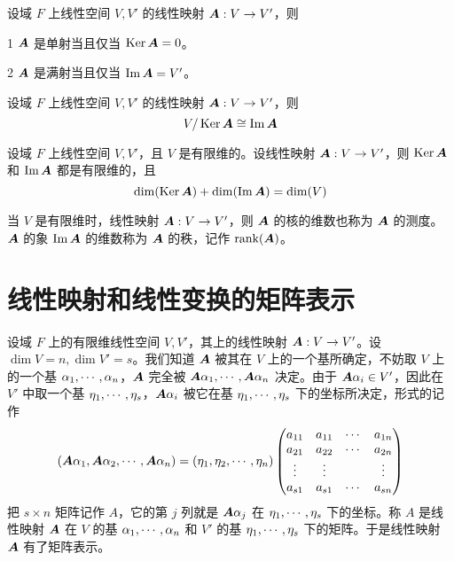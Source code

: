 \begin{proposition}
    设域 $F$ 上线性空间 $V,V'$ 的线性映射 $\boldsymbol{A} : V \to V'$，则
    
    \num{1} $\boldsymbol{A}$ 是单射当且仅当 $\operatorname{Ker} \boldsymbol{A} = 0$。

    \num{2} $\boldsymbol{A}$ 是满射当且仅当 $\operatorname{Im} \boldsymbol{A} = V'$。
\end{proposition}

\begin{theorem}
    设域 $F$ 上线性空间 $V,V'$ 的线性映射 $\boldsymbol{A} : V \to V'$，则
    \[ V / \operatorname{Ker} \boldsymbol{A} \cong \operatorname{Im} \boldsymbol{A} \]
\end{theorem}

\begin{theorem}
    设域 $F$ 上线性空间 $V,V'$，且 $V$ 是有限维的。设线性映射 $\boldsymbol{A} : V \to V'$，则 $\operatorname{Ker} \boldsymbol{A}$ 和 $\operatorname{Im} \boldsymbol{A}$ 都是有限维的，且
    \[ \dim(\operatorname{Ker} \boldsymbol{A}) + \dim(\operatorname{Im} \boldsymbol{A}) = \dim(V) \]
\end{theorem}

当 $V$ 是有限维时，线性映射 $\boldsymbol{A} : V \to V'$，则 $\boldsymbol{A}$ 的核的维数也称为 $\boldsymbol{A}$ 的测度。$\boldsymbol{A}$ 的象 $\operatorname{Im} \boldsymbol{A}$ 的维数称为 $\boldsymbol{A}$ 的秩，记作 $\operatorname{rank}(\boldsymbol{A})$。

\section{线性映射和线性变换的矩阵表示}

设域 $F$ 上的有限维线性空间 $V,V'$，其上的线性映射 $\boldsymbol{A} : V \to V'$。设 $\dim V = n,\dim V' = s$。我们知道 $\boldsymbol{A}$ 被其在 $V$ 上的一个基所确定，不妨取 $V$ 上的一个基 $\alpha_1,\cdots,\alpha_n$，$\boldsymbol{A}$ 完全被 $\boldsymbol{A} \alpha_1,\cdots,\boldsymbol{A} \alpha_n$ 决定。由于 $\boldsymbol{A} \alpha_i \in V'$，因此在 $V'$ 中取一个基 $\eta_1,\cdots,\eta_s$，$\boldsymbol{A} \alpha_i$ 被它在基 $\eta_1,\cdots,\eta_s$ 下的坐标所决定，形式的记作
\[ 
    \left( \boldsymbol{A} \alpha_1 , \boldsymbol{A} \alpha_2 , \cdots , \boldsymbol{A} \alpha_n \right) = 
    \left( \eta_1 , \eta_2 , \cdots , \eta_n \right)
    \left( \begin{matrix}
        a_{11} & a_{11} & \cdots & a_{1n}\\
        a_{21} & a_{22} & \cdots & a_{2n}\\
        \vdots & \vdots &        & \vdots\\
        a_{s1} & a_{s1} & \cdots & a_{sn}
    \end{matrix} \right)
\]
把 $s\times n$ 矩阵记作 $A$，它的第 $j$ 列就是 $\boldsymbol{A} \alpha_j$ 在 $\eta_1,\cdots,\eta_s$ 下的坐标。称 $A$ 是线性映射 $\boldsymbol{A}$ 在 $V$ 的基 $\alpha_1,\cdots,\alpha_n$ 和 $V'$ 的基 $\eta_1,\cdots,\eta_s$ 下的矩阵。于是线性映射 $\boldsymbol{A}$ 有了矩阵表示。

